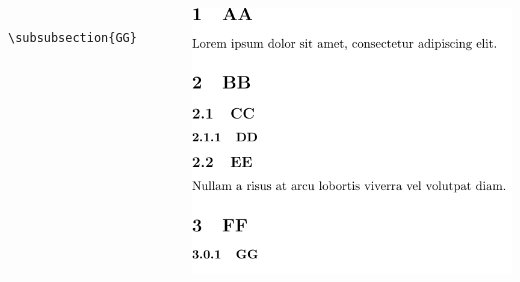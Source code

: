 \begin{frame}[fragile]
\begin{columns}
\begin{column}{0.5\textwidth}
\begin{codebox}
\begin{verbatim}
                    \subsubsection{GG}
                \end{verbatim}
            \end{codebox}
        \end{column}
        \begin{column}{0.5\textwidth}
            \includegraphics[width=\linewidth,height=0.8\textheight,keepaspectratio]{assets/sectioncommands.pdf}
        \end{column}
    \end{columns}
\end{frame}

